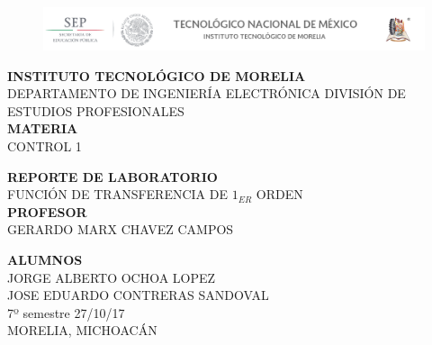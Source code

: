 \documentclass[letterpaper,10pt]{article}
\begin{document}
	
\begin{titlepage}
	\begin{figure}[h!]
		\begin{center}
			\vspace{1.5cm}
			\includegraphics[scale= .5, ]{encabezado.png}
			\label{escudouam1}
			\vspace{-1cm}
		\end{center}
	\end{figure}
	\begin{center}
		\vspace{1cm} 
		\LARGE{\textbf{INSTITUTO TECNOLÓGICO DE MORELIA}} \\
		\vspace{1cm}
		DEPARTAMENTO DE INGENIERÍA ELECTRÓNICA
		DIVISIÓN DE ESTUDIOS PROFESIONALES \\  
		\vspace{2.3cm} {\large \textbf{MATERIA}\\ \LARGE CONTROL 1}
		
		
		\vspace{1.5cm} {\large \textbf{REPORTE DE LABORATORIO}\\ \LARGE FUNCIÓN DE TRANSFERENCIA DE $1_{ER}$ ORDEN}\\ 
		
		\vspace{1.5cm} {\large \textbf{PROFESOR}\\ \LARGE GERARDO MARX CHAVEZ CAMPOS}
		
		\vspace{1.5cm} {\large \textbf{ALUMNOS}\\ \large JORGE ALBERTO OCHOA LOPEZ\\JOSE EDUARDO CONTRERAS SANDOVAL} \\
		\normalsize{7º semestre
			\hfill {27/10/17}}\\ 
		MORELIA, MICHOACÁN
	\end{center}
\end{titlepage}
\pagebreak
\justify
\tableofcontents
\pagebreak
{}
	
\end{document}

